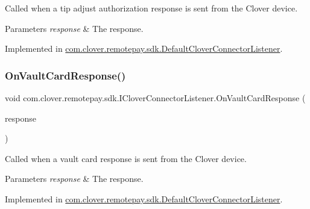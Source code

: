 Called when a tip adjust authorization response is sent from the Clover device. 


\begin{DoxyParams}{Parameters}
{\em response} & The response.\\
\hline
\end{DoxyParams}


Implemented in \hyperlink{classcom_1_1clover_1_1remotepay_1_1sdk_1_1_default_clover_connector_listener_ab81030d438c6c75eb2a2b8ee3fd6f51f}{com.\+clover.\+remotepay.\+sdk.\+Default\+Clover\+Connector\+Listener}.

\mbox{\label{interfacecom_1_1clover_1_1remotepay_1_1sdk_1_1_i_clover_connector_listener_a1abb7953534d225a8f6a2e9c43dac34e}} 
\subsubsection{\texorpdfstring{On\+Vault\+Card\+Response()}{OnVaultCardResponse()}}
{\footnotesize\ttfamily void com.\+clover.\+remotepay.\+sdk.\+I\+Clover\+Connector\+Listener.\+On\+Vault\+Card\+Response (\begin{DoxyParamCaption}\item[{\hyperlink{classcom_1_1clover_1_1remotepay_1_1sdk_1_1_vault_card_response}{Vault\+Card\+Response}}]{response }\end{DoxyParamCaption})}



Called when a vault card response is sent from the Clover device. 


\begin{DoxyParams}{Parameters}
{\em response} & The response.\\
\hline
\end{DoxyParams}


Implemented in \hyperlink{classcom_1_1clover_1_1remotepay_1_1sdk_1_1_default_clover_connector_listener_a99a7cfe7cd6778bc4ec94a06e6f28420}{com.\+clover.\+remotepay.\+sdk.\+Default\+Clover\+Connector\+Listener}.


